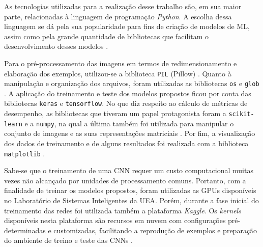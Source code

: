 
As tecnologias utilizadas para a realização desse trabalho são, em sua maior parte, relacionadas à linguagem de programação \emph{Python}. A escolha dessa linguagem se dá pela sua popularidade para fins de criação de modelos de ML, assim como pela grande quantidade de bibliotecas que facilitam o desenvolvimento desses modelos \cite{brink}.

Para o pré-processamento das imagens em termos de redimensionamento e elaboração dos exemplos, utilizou-se a biblioteca \texttt{PIL} (Pillow) \cite{pillow}. Quanto à manipulação e organização dos arquivos, foram utilizadas as bibliotecas \texttt{os} e \texttt{glob} \cite{os,glob}. A aplicação do treinamento e teste dos modelos propostos ficou por conta das bibliotecas \texttt{keras} e \texttt{tensorflow}\cite{keras, tensorflow}. No que diz respeito ao cálculo de métricas de desempenho, as bibliotecas que tiveram um papel protagonista foram a \texttt{scikit-learn} e a \texttt{numpy}, na qual a última também foi utilizada para manipular o conjunto de imagens e as suas representações matriciais \cite{sklearn,numpy}. Por fim, a visualização dos dados de treinamento e de alguns resultados foi realizada com a biblioteca \texttt{matplotlib} \cite{matplotlib}.

Sabe-se que o treinamento de uma CNN requer um custo computacional muitas vezes não alcançado por unidades de processamento comuns. Portanto, com a finalidade de treinar os modelos propostos, foram utilizadas as GPUs disponíveis no Laboratório de Sistemas Inteligentes da UEA. Porém, durante a fase inicial do treinamento das redes foi utilizada também a plataforma \emph{Kaggle}. Os \emph{kernels} disponíveis nesta plataforma são recursos em nuvem com configurações pré-determinadas e customizadas, facilitando a reprodução de exemplos e preparação do ambiente de treino e teste das CNNs \cite{kaggle}.
